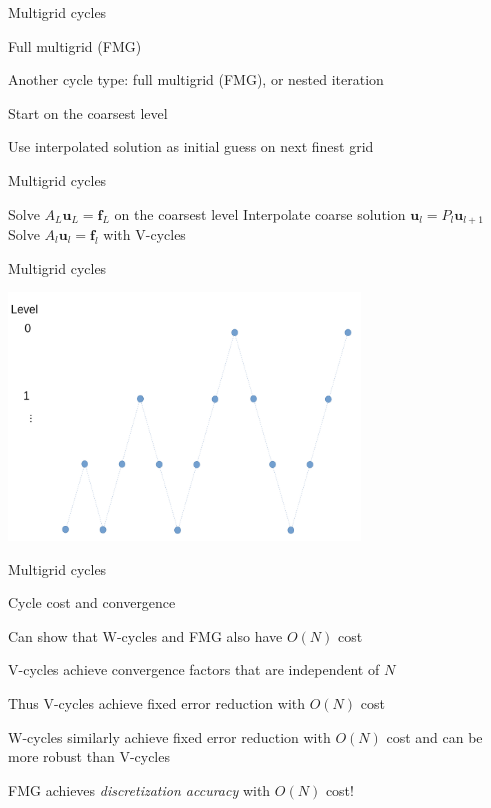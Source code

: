 \documentclass[18pt,xcolor=table]{beamer}
\begin{document}
\begin{frame}{Multigrid cycles}
\begin{block}{Full multigrid (FMG)}
\bit
\item Another cycle type: full multigrid (FMG), or nested iteration
\item Start on the coarsest level
\item Use interpolated solution as initial guess on next finest grid
\eit
\end{block}
\end{frame}

\begin{frame}{Multigrid cycles}
\begin{algorithm}[H]
\caption{Full multigrid (FMG)}
\begin{algorithmic}
\State Solve $A_L\mathbf{u}_L = \mathbf{f}_L$ on the coarsest level
\State Interpolate coarse solution $\mathbf{u}_l = P_l\mathbf{u}_{l+1}$
\State Solve $A_l\mathbf{u}_l = \mathbf{f}_l$ with V-cycles
\EndFor
\end{algorithmic}
\end{algorithm}
\end{frame}

\begin{frame}{Multigrid cycles}
\begin{center}
\includegraphics[width=0.7\textwidth]{../figures/FMGcycle}
\end{center}
\end{frame}

\begin{frame}{Multigrid cycles}
\begin{block}{Cycle cost and convergence}
\bit
\item Can show that W-cycles and FMG also have $O(N)$ cost
\item V-cycles achieve convergence factors that are independent of $N$
\item Thus V-cycles achieve fixed error reduction with $O(N)$ cost
\item W-cycles similarly achieve fixed error reduction with $O(N)$ cost and can be more robust than V-cycles
\item FMG achieves \emph{discretization accuracy} with $O(N)$ cost!
\eit
\end{block}
\end{frame}

\end{document}
